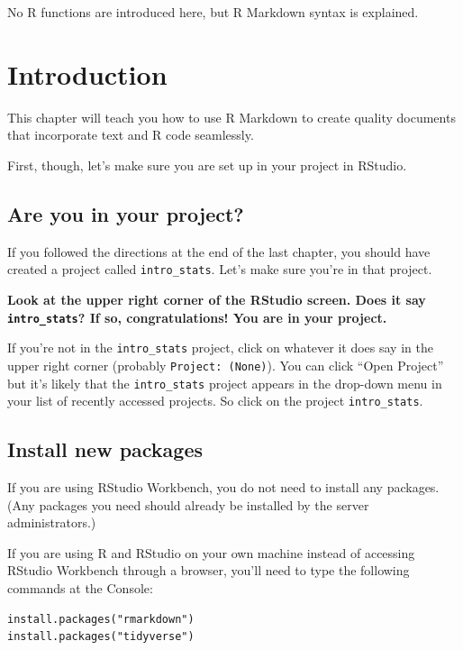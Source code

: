 \documentclass[
]{book}
\begin{document}
No R functions are introduced here, but R Markdown syntax is explained.

\hypertarget{rmark-intro}{%
\section{Introduction}\label{rmark-intro}}

This chapter will teach you how to use R Markdown to create quality documents that incorporate text and R code seamlessly.

First, though, let's make sure you are set up in your project in RStudio.

\hypertarget{rmark-project}{%
\subsection{Are you in your project?}\label{rmark-project}}

If you followed the directions at the end of the last chapter, you should have created a project called \texttt{intro\_stats}. Let's make sure you're in that project.

\textbf{Look at the upper right corner of the RStudio screen. Does it say \texttt{intro\_stats}? If so, congratulations! You are in your project.}

If you're not in the \texttt{intro\_stats} project, click on whatever it does say in the upper right corner (probably \texttt{Project:\ (None)}). You can click ``Open Project'' but it's likely that the \texttt{intro\_stats} project appears in the drop-down menu in your list of recently accessed projects. So click on the project \texttt{intro\_stats}.

\hypertarget{rmark-install}{%
\subsection{Install new packages}\label{rmark-install}}

If you are using RStudio Workbench, you do not need to install any packages. (Any packages you need should already be installed by the server administrators.)

If you are using R and RStudio on your own machine instead of accessing RStudio Workbench through a browser, you'll need to type the following commands at the Console:

\begin{verbatim}
install.packages("rmarkdown")
install.packages("tidyverse")
\end{verbatim}
\end{document}
